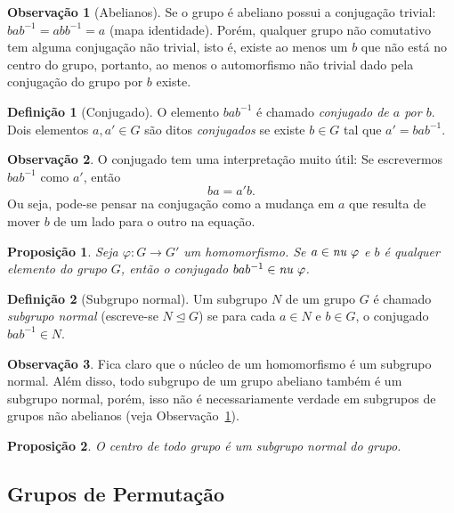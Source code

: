 \documentclass[a4paper,12pt]{report}
\newcommand{\nucleoe}{\emph{\text{nu }}}
\theoremstyle{plain}
\newtheorem{proposicao}{Proposição}[section]
\theoremstyle{definition}
\newtheorem{definicao}{Definição}[section]
\newtheorem{observacao}{Observação}[section]
\begin{document}
\begin{observacao}[Abelianos]\label{ob:conjugadosDeAbelianos}
	Se o grupo é abeliano possui a conjugação trivial:
	\(bab^{ -1} = abb^{-1} = a\) (mapa identidade). Porém, qualquer grupo não comutativo tem alguma conjugação não trivial, isto é, existe ao menos um $b$ que não está no centro do grupo, portanto, ao menos o automorfismo não trivial dado pela conjugação do grupo por $b$ existe. 
\end{observacao}

\begin{definicao}[Conjugado]
	O elemento \(bab^{-1}\) é chamado \emph{conjugado de \(a\) por \(b\)}. Dois elementos \(a, a'\in G\) são ditos \emph{conjugados} se existe \(b\in G\) tal que \(a' = bab^{-1}\).	
\end{definicao}

\begin{observacao}
	O conjugado tem uma interpretação muito útil: Se escrevermos
	\(bab^{-1}\) como \(a'\), então \[ba = a'b.\] Ou seja, pode-se pensar na
	conjugação como a mudança em \(a\) que resulta de mover \(b\) de um lado
	para o outro na equação.
\end{observacao}		


\begin{proposicao}
	Seja $\varphi: G \longrightarrow G'$ um homomorfismo. Se \(a\in \nucleoe\varphi\) e \(b\) é qualquer elemento do grupo \(G\), então o conjugado \(bab^{-1} \in \nucleoe\varphi\).
\end{proposicao}

\begin{definicao}[Subgrupo normal]
	Um subgrupo \(N\) de um grupo \(G\) é chamado \emph{subgrupo normal} (escreve-se $N\trianglelefteq G$) se para cada \(a\in N\) e \(b\in G\), o conjugado
	\(bab^{-1} \in N\).
\end{definicao}

\begin{observacao}
	Fica claro que o núcleo de um homomorfismo é um subgrupo normal. Além disso, todo subgrupo de um grupo abeliano também é um subgrupo normal, porém, isso não é
	necessariamente verdade em subgrupos de grupos não abelianos (veja Observação~\ref{ob:conjugadosDeAbelianos}). 
\end{observacao}

\begin{proposicao}
	O centro de todo grupo é um subgrupo normal do grupo.
\end{proposicao}

\subsection{Grupos de Permutação}
\end{document}
